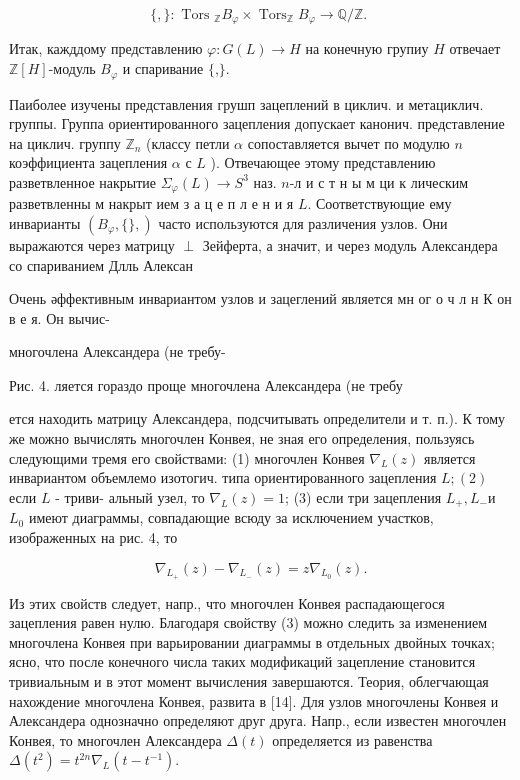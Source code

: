 \documentclass[10pt]{article}
\begin{document}
\[

\{,\}: \text { Tors }_{\mathbb{Z}} B_{\varphi} \times \operatorname{Tors}_{\mathbb{Z}} B_{\varphi} \longrightarrow \mathbb{Q} / \mathbb{Z} \text {. }

\]



Итак, кажддому представлению $\varphi: G(L) \rightarrow H$ на конечную групиу $H$ отвечает $\mathbb{Z}[H]$-модуль $B_{\varphi}$ и спаривание $\{$,$\} .$



Паиболее изучены представления грушп зацеплений в циклич. и метациклич. группы. Группа ориентированного зацепления допускает канонич. представление на циклич. группу $\mathbb{Z}_{n}$ (классу петли $\alpha$ сопоставляется вычет по модулю $n$ коэффициента зацепления $\alpha$ с $L$ ). Отвечающее этому представлению разветвленное накрытие $\Sigma_{\varphi}(L) \rightarrow S^{3}$ наз. $n$-л и с т н ы м ци к лическим разветвленны м накрыт ием з а ц е п л е н и я $L$. Соответствующие ему инварианты $\left(B_{\varphi},\{\},\right)$ часто используются для различения узлов. Они выражаются через матрицу $\perp$ Зейферта, а значит, и через модуль Александера со спариванием Длль Алексан



Очень әффективным инвариантом узлов и зацеглений является мн ог о ч л н $К$ он в е я. Он вычис-

многочлена Александера (не требу-



Рис. 4. ляется гораздо проще многочлена Александера (не требу

ется находить матрицу Александера, подсчитывать определители и т. п.). К тому же можно вычислять многочлен Конвея, не зная его определения, пользуясь следующими тремя его свойствами: (1) многочлен Конвея $\nabla_{L}(z)$ является инвариантом объемлемо изотогич. типа ориентированного зацепления $L ;(2)$ если $L$ - триви- альный узел, то $\nabla_{L}(z)=1$; (3) если три зацепления $L_{+}, L_{-}$и $L_{0}$ имеют диаграммы, совпадающие всюду за исключением участков, изображенных на рис. 4, то



\[

\nabla_{L_{+}}(z)-\nabla_{L_{-}}(z)=z \nabla_{L_{0}}(z) .

\]



Из этих свойств следует, напр., что многочлен Конвея распадающегося зацепления равен нулю. Благодаря свойству (3) можно следить за изменением многочлена Конвея при варьировании диаграммы в отдельных двойных точках; ясно, что после конечного числа таких модификаций зацепление становится тривиальным и в этот момент вычисления завершаются. Теория, облегчающая нахождение многочлена Конвея, развита в [14]. Для узлов многочлены Конвея и Александера однозначно определяют друг друга. Напр., если известен многочлен Конвея, то многочлен Александера $\Delta(t)$ определяется из равенства $\Delta\left(t^{2}\right)=t^{2 n} \nabla_{L}\left(t-t^{-1}\right)$.
\end{document}
